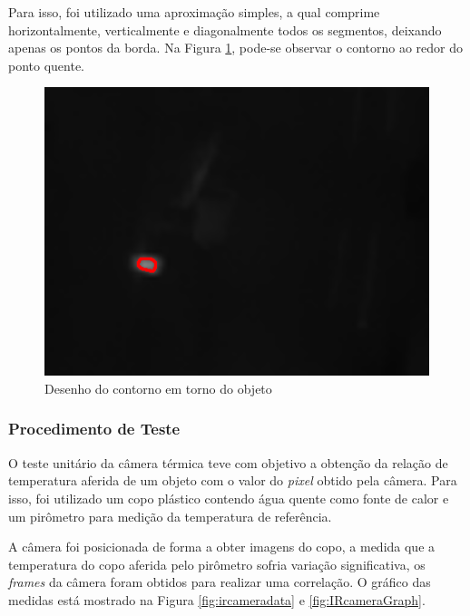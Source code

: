 		Para isso, foi utilizado uma aproximação simples, a qual comprime horizontalmente, verticalmente e diagonalmente todos os segmentos, deixando apenas os pontos da borda. Na Figura \ref{fig:contour}, pode-se observar o contorno ao redor do ponto quente.
		
		\begin{figure}[!ht]
		   \centering
		   \includegraphics[width=12cm]{Figures/contorno.png}
		   \caption{Desenho do contorno em torno do objeto}
		   \label{fig:contour}
		\end{figure}
		
		\subsubsection{Procedimento de Teste}
		
		O teste unitário da câmera térmica teve com objetivo a obtenção da relação de temperatura aferida de um objeto com o valor do \textit{pixel} obtido pela câmera. Para isso, foi utilizado um copo plástico contendo água quente como fonte de calor e um pirômetro para medição da temperatura de referência.
		
		 A câmera foi posicionada de forma a obter imagens do copo, a medida que a temperatura do copo aferida pelo pirômetro sofria variação significativa, os \textit{frames} da câmera foram obtidos para realizar uma correlação. O gráfico das medidas está mostrado na Figura \ref{fig:ircameradata} e \ref{fig:IRcameraGraph}.
		
